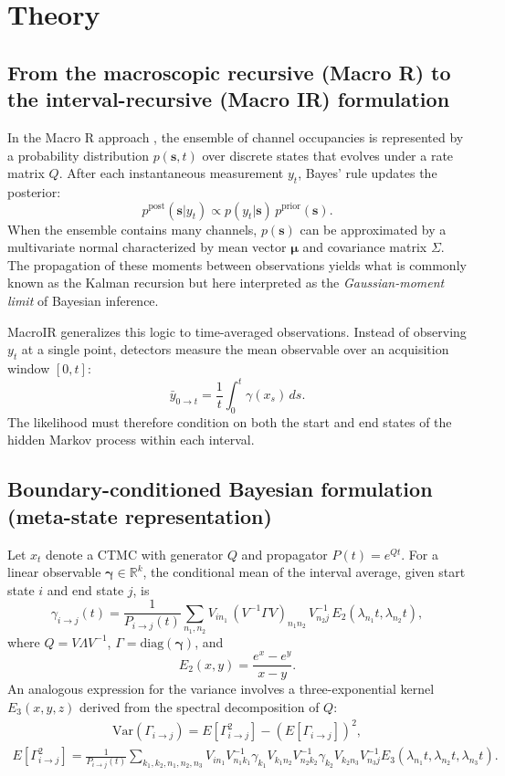 \documentclass[9pt]{elife}
\begin{document}
	\section*{Theory}
	
	\subsection*{From the macroscopic recursive (Macro R) to the interval-recursive (Macro IR) formulation}
	
	In the Macro R approach \citep{Moffatt2007}, the ensemble of channel occupancies is represented by a probability distribution $p(\mathbf{s},t)$ over discrete states that evolves under a rate matrix $Q$.  
	After each instantaneous measurement $y_t$, Bayes’ rule updates the posterior:
	\[
	p^{\text{post}}(\mathbf{s}|y_t) \propto p(y_t|\mathbf{s})\,p^{\text{prior}}(\mathbf{s}).
	\]
	When the ensemble contains many channels, $p(\mathbf{s})$ can be approximated by a multivariate normal characterized by mean vector $\bm{\mu}$ and covariance matrix $\Sigma$.  
	The propagation of these moments between observations yields what is commonly known as the Kalman recursion but here interpreted as the \emph{Gaussian-moment limit} of Bayesian inference.
	
	MacroIR generalizes this logic to time-averaged observations.  
	Instead of observing $y_t$ at a single point, detectors measure the mean observable over an acquisition window $[0,t]$:
	\[
	\bar y_{0\to t} = \frac{1}{t}\int_0^t \gamma(x_s)\,ds.
	\]
	The likelihood must therefore condition on both the start and end states of the hidden Markov process within each interval.
	
	\subsection*{Boundary-conditioned Bayesian formulation (meta-state representation)}
	
	Let $x_t$ denote a CTMC with generator $Q$ and propagator $P(t)=e^{Qt}$.  
	For a linear observable $\bm{\gamma}\in\mathbb{R}^k$, the conditional mean of the interval average, given start state $i$ and end state $j$, is
	\begin{equation}
		\gamma_{i\to j}(t)
		= \frac{1}{P_{i\to j}(t)}
		\sum_{n_1,n_2}
		V_{i n_1}\,(V^{-1}\Gamma V)_{n_1 n_2}\,V^{-1}_{n_2 j}\,
		E_2(\lambda_{n_1} t, \lambda_{n_2} t),
	\end{equation}
	where $Q=V\Lambda V^{-1}$, $\Gamma=\mathrm{diag}(\bm{\gamma})$, and
	\[
	E_2(x,y)=\frac{e^x-e^y}{x-y}.
	\]
	An analogous expression for the variance involves a three-exponential kernel $E_3(x,y,z)$ derived from the spectral decomposition of $Q$:
	\begin{align}
		\mathrm{Var}(\Gamma_{i\to j}) 
		= E[\Gamma^2_{i\to j}] - (E[\Gamma_{i\to j}])^2,
	\end{align}
	\begin{align}
		E[\Gamma^2_{i\to j}] 
		= \frac{1}{P_{i\to j}(t)}
		\sum_{k_1,k_2,n_1,n_2,n_3}
		V_{i n_1}V^{-1}_{n_1 k_1}\gamma_{k_1}
		V_{k_1 n_2}V^{-1}_{n_2 k_2}\gamma_{k_2}
		V_{k_2 n_3}V^{-1}_{n_3 j}
		E_3(\lambda_{n_1}t,\lambda_{n_2}t,\lambda_{n_3}t).
	\end{align}
	
\end{document}
